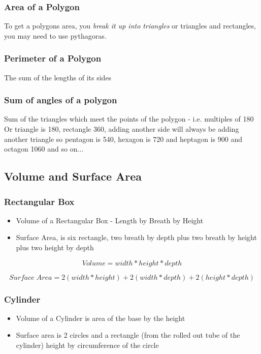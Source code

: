 \documentclass{article}
\begin{document}
\subsubsection{Area of a Polygon}
To get a polygons area, you \textit{break it up into triangles} or triangles and rectangles, you may need to use pythagoras.
\subsubsection{Perimeter of a Polygon}
The sum of the lengths of its sides
\subsubsection{Sum of angles of a polygon}
Sum of the triangles which meet the points of the polygon - i.e. multiples of 180
Or triangle is 180, rectangle 360, adding another side will always be adding another triangle so
pentagon is 540, hexagon is 720 and heptagon is 900 and octagon 1060 and so on...


\newpage
\subsection{Volume and Surface Area}
\subsubsection{Rectangular Box}
\begin{itemize}
\item Volume of a Rectangular Box - Length by Breath by Height
\item Surface Area, is six rectangle, two breath by depth plus two breath by height plus two height by depth
\end{itemize}

\begin{equation}
Volume = width * height * depth
\end{equation}

\begin{equation}
Surface\;Area = 2(width * height) + 2(width * depth) + 2(height * depth)
\end{equation}

\subsubsection{Cylinder}
\begin{itemize}
\item Volume of a Cylinder is area of the base by the height
\item Surface area is 2 circles and a rectangle (from the rolled out tube of the cylinder) height by circumference of the circle
\end{itemize}
\end{document}
